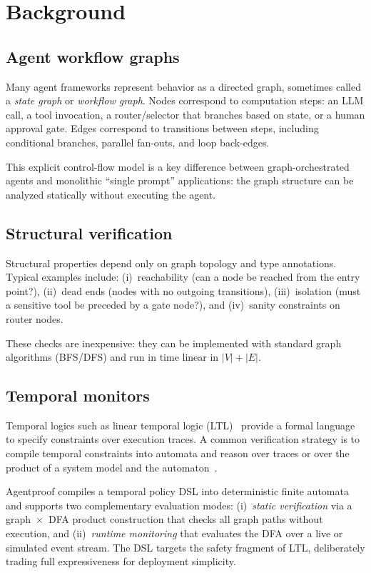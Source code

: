 \section{Background}
\label{sec:background}

\subsection{Agent workflow graphs}
Many agent frameworks represent behavior as a directed graph, sometimes
called a \emph{state graph} or \emph{workflow graph}. Nodes correspond
to computation steps: an LLM call, a tool invocation, a
router/selector that branches based on state, or a human approval gate.
Edges correspond to transitions between steps, including conditional
branches, parallel fan-outs, and loop back-edges.

This explicit control-flow model is a key difference between
graph-orchestrated agents and monolithic ``single prompt''
applications: the graph structure can be analyzed statically without
executing the agent.

\subsection{Structural verification}
Structural properties depend only on graph topology and type
annotations. Typical examples include:
(i)~reachability (can a node be reached from the entry point?),
(ii)~dead ends (nodes with no outgoing transitions),
(iii)~isolation (must a sensitive tool be preceded by a gate node?),
and (iv)~sanity constraints on router nodes.

These checks are inexpensive: they can be implemented with standard
graph algorithms (BFS/DFS) and run in time linear in $|V| + |E|$.

\subsection{Temporal monitors}
Temporal logics such as linear temporal logic
(LTL)~\citep{pnueli1977temporal} provide a formal language to specify
constraints over execution traces. A common verification strategy is to
compile temporal constraints into automata and reason over traces or
over the product of a system model and the
automaton~\citep{vardi1994automata}.

Agentproof compiles a temporal policy DSL into deterministic finite
automata and supports two complementary evaluation modes:
(i)~\emph{static verification} via a graph~$\times$~DFA product
construction that checks all graph paths without execution, and
(ii)~\emph{runtime monitoring} that evaluates the DFA over a live or
simulated event stream.  The DSL targets the safety fragment of LTL,
deliberately trading full expressiveness for deployment simplicity.

